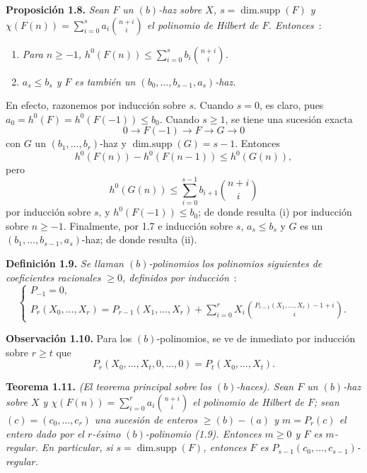 \textbf{Proposición 1.8.} \emph{Sean \(F\) un \((b)\)-haz sobre \(X\),
\(s=\operatorname{dim{.}supp}(F)\) y
\(\chi(F(n))=\sum_{i=0}^{s}a_i\binom{n+i}{i}\) el polinomio de Hilbert de
\(F\). Entonces}~:
\begin{enumerate}[label=(\roman*)]
\item \emph{Para \(n\ge -1\),
\(h^0(F(n))\le \sum_{i=0}^{s}b_i\binom{n+i}{i}\).}
\item \emph{\(a_s\le b_s\) y \(F\) es también un
\((b_0,\ldots,b_{s-1},a_s)\)-haz.}
\end{enumerate}
En efecto, razonemos por inducción sobre \(s\). Cuando \(s=0\), es claro,
pues \(a_0=h^0(F)=h^0(F(-1))\le b_0\). Cuando \(s\ge1\), se tiene una
sucesión exacta
\[
0\longrightarrow F(-1)\longrightarrow F\longrightarrow G\longrightarrow0
\]
con \(G\) un \((b_1,\ldots,b_r)\)-haz y
\(\operatorname{dim{.}supp}(G)=s-1\). Entonces
\[
h^0(F(n))-h^0(F(n-1))\le h^0(G(n)),
\]
pero
\[
h^0(G(n))\le\sum_{i=0}^{s-1}b_{i+1}\binom{n+i}{i}
\]
por inducción sobre \(s\), y \(h^0(F(-1))\le b_0\); de donde resulta (i)
por inducción sobre \(n\ge -1\). Finalmente, por 1.7 e inducción sobre
\(s\), \(a_s\le b_s\) y \(G\) es un
\((b_1,\ldots,b_{s-1},a_s)\)-haz; de donde resulta (ii).

\textbf{Definición 1.9.} \emph{Se llaman \emph{\((b)\)-polinomios} los
polinomios siguientes de coeficientes racionales \(\ge0\), definidos por
inducción}~:
\[
\begin{cases}
P_{-1}=0,\\
P_r(X_0,\ldots,X_r)=P_{r-1}(X_1,\ldots,X_r)
+\displaystyle\sum_{i=0}^{r}X_i
\binom{P_{r-1}(X_1,\ldots,X_r)-1+i}{i}.
\end{cases}
\]

\textbf{Observación 1.10.} Para los \((b)\)-polinomios, se ve de inmediato
por inducción sobre \(r\ge t\) que
\[
P_r(X_0,\ldots,X_t,0,\ldots,0)=P_t(X_0,\ldots,X_t).
\]

\textbf{Teorema 1.11.} \emph{(El teorema principal sobre los
\((b)\)-haces). Sean \(F\) un \((b)\)-haz sobre \(X\) y
\(\chi(F(n))=\sum_{i=0}^{r}a_i\binom{n+i}{i}\) el polinomio de Hilbert de
\(F\); sean \((c)=(c_0,\ldots,c_r)\) una sucesión de enteros
\(\ge (b)-(a)\) y \(m=P_r(c)\) el entero dado por el \(r\)-ésimo
\((b)\)-polinomio (1.9). Entonces \(m\ge0\) y \(F\) es \(m\)-regular. En
particular, si \(s=\operatorname{dim{.}supp}(F)\), entonces \(F\) es
\(P_{s-1}(c_0,\ldots,c_{s-1})\)-regular.}

